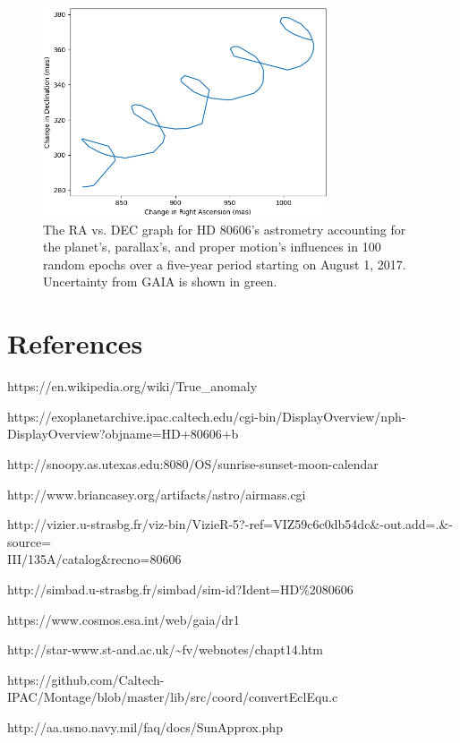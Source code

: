 \documentclass[12pt]{article}
\begin{document}
\begin{figure}[H]
\centering
\includegraphics[width=0.75\textwidth]{proper_ra_dec.png}
\vspace{-1em}
\caption{The RA vs. DEC graph for HD 80606's astrometry accounting for the planet's, parallax's, and proper motion's influences in 100 random epochs over a five-year period starting on August 1, 2017. Uncertainty from GAIA is shown in green.}
\end{figure}


\section*{References}
\begin{mylist}
\item https://en.wikipedia.org/wiki/True\_anomaly
\item https://exoplanetarchive.ipac.caltech.edu/cgi-bin/DisplayOverview/nph-\\DisplayOverview?objname=HD+80606+b
\item http://snoopy.as.utexas.edu:8080/OS/sunrise-sunset-moon-calendar
\item http://www.briancasey.org/artifacts/astro/airmass.cgi
\item http://vizier.u-strasbg.fr/viz-bin/VizieR-5?-ref=VIZ59c6c0db54dc\&-out.add=.\&-source=\\III/135A/catalog\&recno=80606
\item http://simbad.u-strasbg.fr/simbad/sim-id?Ident=HD\%2080606
\item https://www.cosmos.esa.int/web/gaia/dr1
\item http://star-www.st-and.ac.uk/\textasciitilde{}fv/webnotes/chapt14.htm
\item https://github.com/Caltech-IPAC/Montage/blob/master/lib/src/coord/convertEclEqu.c
\item http://aa.usno.navy.mil/faq/docs/SunApprox.php
\end{mylist}
\end{document}

